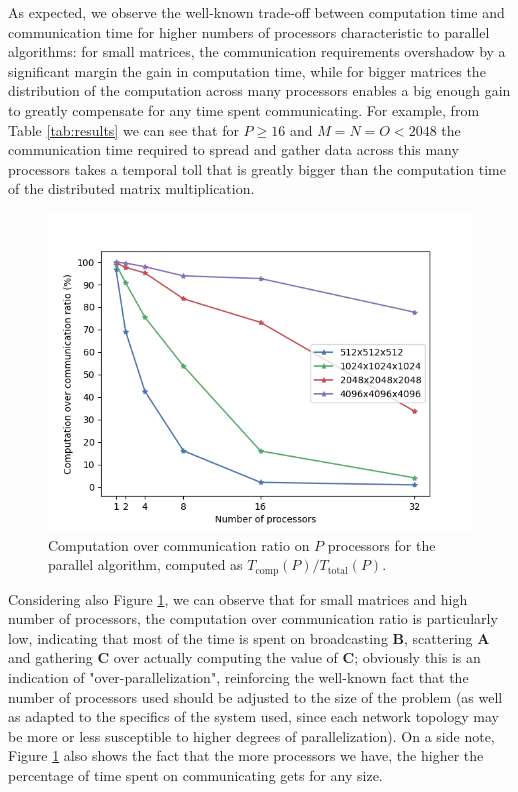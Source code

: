 As expected, we observe the well-known trade-off between computation time and communication time for higher numbers of processors characteristic to parallel algorithms: for small matrices, the communication requirements overshadow by a significant margin the gain in computation time, while for bigger matrices the distribution of the computation across many processors enables a big enough gain to greatly compensate for any time spent communicating. 
For example, from Table \ref{tab:results} we can see that for $P \ge 16$ and $M=N=O < 2048$ the communication time required to spread and gather data across this many processors takes a temporal toll that is greatly bigger than the computation time of the distributed matrix multiplication.

\begin{figure}[hb!]
    \centering
    \includegraphics[width=0.8\linewidth]{figures/comp_over_comm.png}
    \caption{Computation over communication ratio on $P$ processors for the parallel algorithm, computed as $T_{\text{comp}}(P)/T_{\text{total}}(P).$}
    \label{fig:compcomm}
\end{figure}

Considering also Figure \ref{fig:compcomm}, we can observe that for small matrices and high number of processors, the computation over communication ratio is particularly low, indicating that most of the time is spent on broadcasting $\textbf{B}$, scattering $\textbf{A}$ and gathering $\textbf{C}$ over actually computing the value of $\textbf{C}$; obviously this is an indication of "over-parallelization", reinforcing the well-known fact that the number of processors used should be adjusted to the size of the problem (as well as adapted to the specifics of the system used, since each network topology may be more or less susceptible to higher degrees of parallelization).
On a side note, Figure \ref{fig:compcomm} also shows the fact that the more processors we have, the higher the percentage of time spent on communicating gets for any size.


